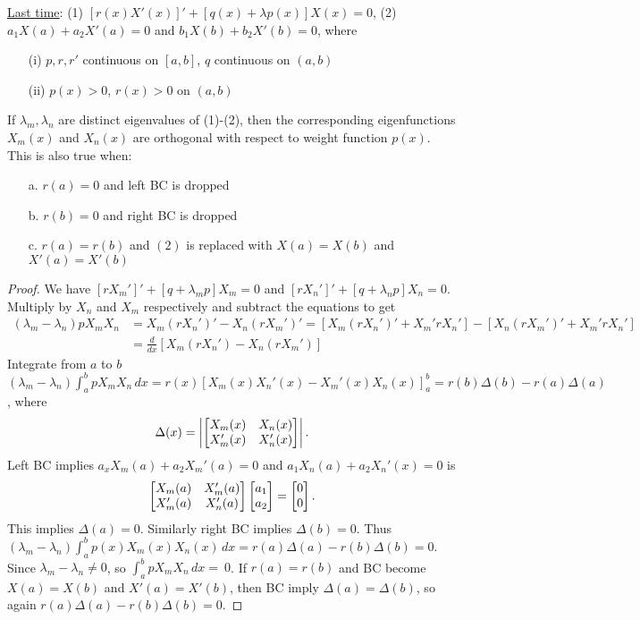 \documentclass[]{article}
\begin{document}
\underline{Last time}: (1) $[r(x)X'(x)]' + [q(x)+\lambda p(x)]X(x) = 0$, (2) $a_1 X(a) + a_2 X'(a) = 0$ and $b_1 X(b) + b_2 X'(b) = 0$, where
\begin{enumerate}
	\item[(i)] $p,r,r'$ continuous on $[a,b]$, $q$ continuous on $(a,b)$
	\item[(ii)] $p(x)>0$, $r(x)>0$ on $(a,b)$
\end{enumerate}
\begin{recall}
	 If $\lambda_m,\lambda_n$ are distinct eigenvalues of (1)-(2), then the corresponding eigenfunctions $X_m(x)$ and $X_n(x)$ are orthogonal with respect to weight function $p(x)$.
	This is also true when:
	\begin{enumerate}
		\item[a.] $r(a) = 0$ and left BC is dropped
		\item[b.] $r(b) = 0$ and right BC is dropped
		\item[c.] $r(a) = r(b)$ and $(2)$ is replaced with $X(a) = X(b)$ and $X'(a) = X'(b)$
	\end{enumerate}
\end{recall}
\begin{proof}
	We have $[rX_m']' + [q+\lambda_m p]X_m = 0$ and	$[rX_n']' + [q+\lambda_n p] X_n = 0$. Multiply by $X_n$ and $X_m$ respectively and subtract the equations to get
	\begin{align*}
	(\lambda_m - \lambda_n) p X_m X_n &= X_m (rX_n')' - X_n (rX_m')' = [ X_m (rX_n')' + X_m' r X_n'] - [X_n (rX_m')' + X_m' r X_n'] \\
	&= \frac{d}{dx} [X_m (r X_n') - X_n ( r X_m')]
	\end{align*}
	Integrate from $a$ to $b$
	$(\lambda_m - \lambda_n) \int_a^b p X_m X_n \, dx = r(x) \left[ X_m(x) X_n'(x) - X_m'(x) X_n(x) \right]_a^b = r(b) \Delta(b) - r(a) \Delta(a)$,
	where $$\Delta(x) = \left| \begin{bmatrix}X_m(x) & X_n(x) \\ X_m'(x) & X_n'(x)\end{bmatrix} \right|.$$ Left BC implies $a_x X_m(a) + a_2 X_m'(a) = 0$ and $a_1 X_n(a) + a_2 X_n'(x) = 0$ is $$\begin{bmatrix} X_m(a) & X_m'(a) \\ X_m'(a) & X_n'(a) \end{bmatrix} \begin{bmatrix} a_1 \\ a_2\end{bmatrix} = \begin{bmatrix}0 \\ 0\end{bmatrix}.$$ This implies $\Delta(a) = 0$. Similarly right BC implies $\Delta(b) = 0$. Thus $(\lambda_m - \lambda_n) \int_a^b p(x) X_m(x) X_n(x) \, dx = r(a) \Delta(a) - r(b) \Delta(b) = 0$. Since $\lambda_m - \lambda_n \neq 0$, so $\int_a^b p X_m X_n \, dx =~0$.
	If $r(a) = r(b)$ and BC become $X(a) = X(b)$ and $X'(a)= X'(b)$, then BC imply $\Delta(a) = \Delta(b)$, so again $r(a) \Delta(a) - r(b) \Delta(b) = 0$.
\end{proof}
\end{document}
